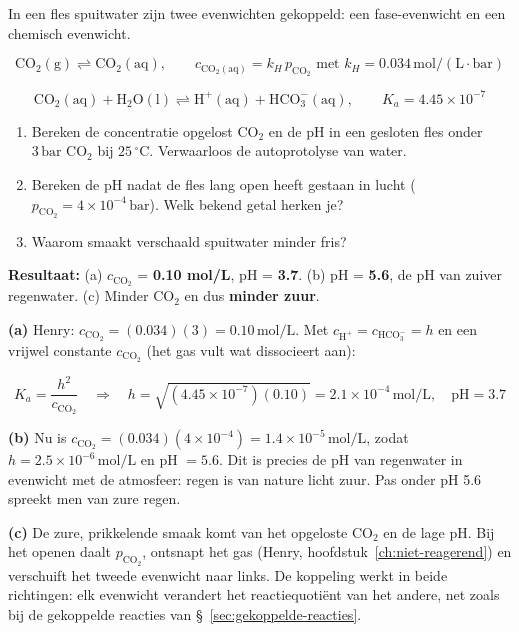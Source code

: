 \begin{oefening}
In een fles spuitwater zijn twee evenwichten gekoppeld: een fase-evenwicht en een chemisch evenwicht.

\[
\mathrm{CO_2(g) \rightleftharpoons CO_2(aq)}, \qquad c_{\mathrm{CO_2(aq)}} = k_H\,p_{\mathrm{CO_2}} \text{ met } k_H = 0.034\,\mathrm{mol/(L\cdot bar)}
\]

\[
\mathrm{CO_2(aq) + H_2O(l) \rightleftharpoons H^+(aq) + HCO_3^-(aq)}, \qquad K_a = 4.45\times10^{-7}
\]

\begin{enumerate}
\item[(a)]
  Bereken de concentratie opgelost \(\mathrm{CO_2}\) en de pH in een gesloten fles onder \(3\,\mathrm{bar}\) \(\mathrm{CO_2}\) bij \(25\,^\circ\mathrm{C}\). Verwaarloos de autoprotolyse van water.
\item[(b)]
  Bereken de pH nadat de fles lang open heeft gestaan in lucht (\(p_{\mathrm{CO_2}} = 4\times10^{-4}\,\mathrm{bar}\)). Welk bekend getal herken je?
\item[(c)]
  Waarom smaakt verschaald spuitwater minder fris?
\end{enumerate}
\end{oefening}
\begin{oplossing}
\textbf{Resultaat:} (a) \(c_{\mathrm{CO_2}}\) = \textbf{0.10 mol/L}, pH = \textbf{3.7}. (b) pH = \textbf{5.6}, de pH van zuiver regenwater. (c) Minder CO\ensuremath{_{2}} en dus \textbf{minder zuur}.

\textbf{(a)} Henry: \(c_{\mathrm{CO_2}} = (0.034)(3) = 0.10\,\mathrm{mol/L}\). Met \(c_{\mathrm{H^+}} = c_{\mathrm{HCO_3^-}} = h\) en een vrijwel constante \(c_{\mathrm{CO_2}}\) (het gas vult wat dissocieert aan):

\[
K_a = \frac{h^2}{c_{\mathrm{CO_2}}} \quad\Rightarrow\quad h = \sqrt{(4.45\times10^{-7})(0.10)} = 2.1\times10^{-4}\,\mathrm{mol/L}, \quad \mathrm{pH} = 3.7
\]

\textbf{(b)} Nu is \(c_{\mathrm{CO_2}} = (0.034)(4\times10^{-4}) = 1.4\times10^{-5}\,\mathrm{mol/L}\), zodat \(h = 2.5\times10^{-6}\,\mathrm{mol/L}\) en pH \(= 5.6\). Dit is precies de pH van regenwater in evenwicht met de atmosfeer: regen is van nature licht zuur. Pas onder pH 5.6 spreekt men van zure regen.

\textbf{(c)} De zure, prikkelende smaak komt van het opgeloste \(\mathrm{CO_2}\) en de lage pH. Bij het openen daalt \(p_{\mathrm{CO_2}}\), ontsnapt het gas (Henry, hoofdstuk~\ref{ch:niet-reagerend}) en verschuift het tweede evenwicht naar links. De koppeling werkt in beide richtingen: elk evenwicht verandert het reactiequotiënt van het andere, net zoals bij de gekoppelde reacties van \S~\ref{sec:gekoppelde-reacties}.
\end{oplossing}

